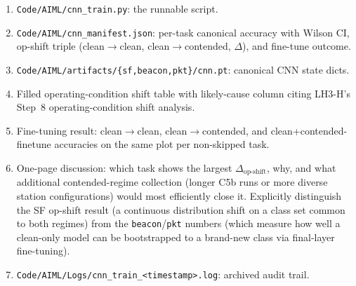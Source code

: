 \documentclass[11pt,letterpaper]{article}
\begin{document}
\begin{tcolorbox}[deliverable={Lab Handout 4-F Deliverable}]
	\begin{enumerate}[leftmargin=1.2em]
		\item \texttt{Code/AIML/cnn\_train.py}: the runnable script.
		\item \texttt{Code/AIML/cnn\_manifest.json}: per-task canonical accuracy with Wilson CI, op-shift triple (clean$\to$clean, clean$\to$contended, $\Delta$), and fine-tune outcome.
		\item \texttt{Code/AIML/artifacts/\{sf,beacon,pkt\}/cnn.pt}: canonical CNN state dicts.
		\item Filled operating-condition shift table with likely-cause column citing LH3-H's Step~8 operating-condition shift analysis.
		\item Fine-tuning result: clean$\to$clean, clean$\to$contended, and clean+contended-finetune accuracies on the same plot per non-skipped task.
		\item One-page discussion: which task shows the largest $\Delta_{\text{op-shift}}$, why, and what additional contended-regime collection (longer C5b runs or more diverse station configurations) would most efficiently close it. Explicitly distinguish the SF op-shift result (a continuous distribution shift on a class set common to both regimes) from the \texttt{beacon}/\texttt{pkt} numbers (which measure how well a clean-only model can be bootstrapped to a brand-new class via final-layer fine-tuning).
		\item \texttt{Code/AIML/Logs/cnn\_train\_<timestamp>.log}: archived audit trail.
	\end{enumerate}
\end{tcolorbox}

\printhandoutglossary
\end{document}
